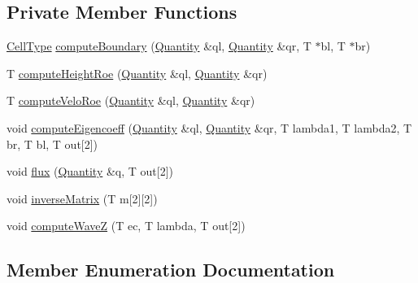 \subsection*{Private Member Functions}
\begin{DoxyCompactItemize}
\item 
\hyperlink{classsolver_1_1FWave_a311594734127c119adecdc164293b705}{Cell\+Type} \hyperlink{classsolver_1_1FWave_a96e9fc19889c093a3b566e84165574f7}{compute\+Boundary} (\hyperlink{structsolver_1_1FWave_1_1Quantity}{Quantity} \&ql, \hyperlink{structsolver_1_1FWave_1_1Quantity}{Quantity} \&qr, T $\ast$bl, T $\ast$br)
\item 
T \hyperlink{classsolver_1_1FWave_afff9d749891aaa8e6efcf66962549d08}{compute\+Height\+Roe} (\hyperlink{structsolver_1_1FWave_1_1Quantity}{Quantity} \&ql, \hyperlink{structsolver_1_1FWave_1_1Quantity}{Quantity} \&qr)
\item 
T \hyperlink{classsolver_1_1FWave_a70acc5f433ed8236e5258fdb612c143a}{compute\+Velo\+Roe} (\hyperlink{structsolver_1_1FWave_1_1Quantity}{Quantity} \&ql, \hyperlink{structsolver_1_1FWave_1_1Quantity}{Quantity} \&qr)
\item 
void \hyperlink{classsolver_1_1FWave_ad17bab0aaaf1cead99aaae8df2d1207a}{compute\+Eigencoeff} (\hyperlink{structsolver_1_1FWave_1_1Quantity}{Quantity} \&ql, \hyperlink{structsolver_1_1FWave_1_1Quantity}{Quantity} \&qr, T lambda1, T lambda2, T br, T bl, T out\mbox{[}2\mbox{]})
\item 
void \hyperlink{classsolver_1_1FWave_a69befe04e701c375627d32b608032dae}{flux} (\hyperlink{structsolver_1_1FWave_1_1Quantity}{Quantity} \&q, T out\mbox{[}2\mbox{]})
\item 
void \hyperlink{classsolver_1_1FWave_ad9de808829e9fdfb2d299643cc53448b}{inverse\+Matrix} (T m\mbox{[}2\mbox{]}\mbox{[}2\mbox{]})
\item 
void \hyperlink{classsolver_1_1FWave_a00283d0def2919fea709631aca3e583a}{compute\+Wave\+Z} (T ec, T lambda, T out\mbox{[}2\mbox{]})
\end{DoxyCompactItemize}


\subsection{Member Enumeration Documentation}
\hypertarget{classsolver_1_1FWave_a311594734127c119adecdc164293b705}{}
